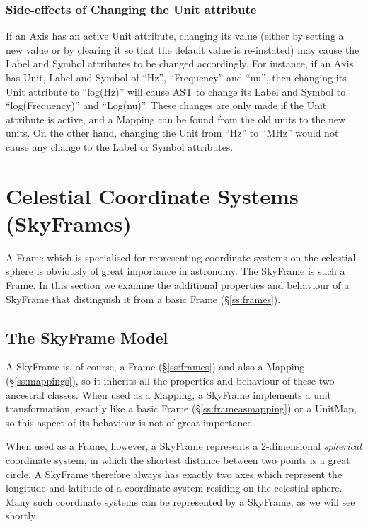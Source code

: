\documentclass[twoside,11pt]{starlink}
\providecommand{\secref}[1]{\S\ref{#1}}
\begin{document}
\subsubsection{Side-effects of Changing the Unit attribute}
If an Axis has an active Unit attribute, changing its value (either by
setting a new value or by clearing it so that the default value is
re-instated) may cause the Label and Symbol attributes to be changed
accordingly. For instance, if an Axis has Unit, Label and Symbol of ``Hz'',
``Frequency'' and ``nu'', then changing its Unit attribute to ``log(Hz)''
will cause AST to change its Label and Symbol to ``log(Frequency)'' and
``Log(nu)''. These changes are only made if the Unit attribute is active,
and a Mapping can be found from the old units to the new units. On the other
 hand, changing the Unit from ``Hz'' to ``MHz'' would not cause any change
to the Label or Symbol attributes.

\cleardoublepage
\section{\label{ss:skyframes}Celestial Coordinate Systems (SkyFrames)}

A Frame which is specialised for representing coordinate systems on
the celestial sphere is obviously of great importance in
astronomy. The SkyFrame is such a Frame. In this section we examine
the additional properties and behaviour of a SkyFrame that distinguish
it from a basic Frame (\secref{ss:frames}).

\subsection{The SkyFrame Model}

A SkyFrame is, of course, a Frame (\secref{ss:frames}) and also a
Mapping (\secref{ss:mappings}), so it inherits all the properties and
behaviour of these two ancestral classes.  When used as a Mapping, a
SkyFrame implements a unit transformation, exactly like a basic Frame
(\secref{ss:frameasmapping}) or a UnitMap, so this aspect of its
behaviour is not of great importance.

When used as a Frame, however, a SkyFrame represents a 2-dimensional
\emph{spherical} coordinate system, in which the shortest distance
between two points is a great circle.  A SkyFrame therefore always has
exactly two axes which represent the longitude and latitude of a
coordinate system residing on the celestial sphere. Many such
coordinate systems can be represented by a SkyFrame, as we will see
shortly.
\end{document}

